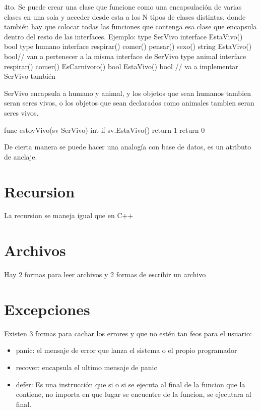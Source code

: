 4to. Se puede crear una clase que funcione como una encapsulación de varias clases en una sola y acceder desde esta a los N tipos de clases distintas, donde también hay que colocar todas las funciones que contenga esa clase que encapsula dentro del resto de las interfaces.
Ejemplo:
type SerVivo interface{
	EstaVivo() bool 
}
type humano interface{
	respirar()
	comer()
	pensar()
	sexo() string
	EstaVivo() bool// van a pertenecer a la misma interface de SerVivo
}
type animal interface{
	respirar()
	comer()
	EsCarnivoro() bool
	EstaVivo() bool // va a implementar SerVivo también
}

SerVivo encapsula a humano y animal, y los objetos que sean humanos tambien seran seres vivos, o los objetos que sean declarados como animales tambien seran seres vivos. 

func estoyVivo(sv SerVivo) int {
	if sv.EstaVivo() {return 1}
	return 0
}

De cierta manera se puede hacer una analogía con base de datos, es un atributo de anclaje.

\section{Recursion}
\par La recursion se maneja igual que en C++

\section {Archivos}
\par Hay 2 formas para leer archivos y 2 formas de escribir un archivo

\section{Excepciones}
\par Existen 3 formas para cachar los errores y que no estén tan feos para el usuario:
\begin{itemize}
    \item panic: el mensaje de error que lanza el sistema o el propio programador
    \item recover: encapsula el ultimo mensaje de panic 
    \item defer: Es una instrucción que si o si se ejecuta al final de la funcion que la contiene, no importa en que lugar se encuentre de la funcion, se ejecutara al final.
\end{itemize}


